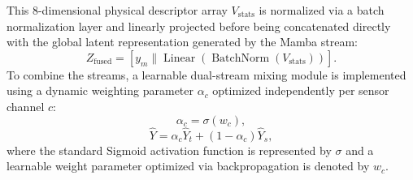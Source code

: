 \documentclass[runningheads]{llncs}
\begin{document}
This 8-dimensional physical descriptor array $V_{\text{stats}}$ is normalized via a batch normalization layer and linearly projected before being concatenated directly with the global latent representation generated by the Mamba stream:
\begin{equation}
Z_{\text{fused}} = \left[ y_{m} \parallel \operatorname{Linear}\left(\operatorname{BatchNorm}\left(V_{\text{stats}}\right)\right) \right].
\tag{19}
\end{equation}
To combine the streams, a learnable dual-stream mixing module is implemented using a dynamic weighting parameter $\alpha_{c}$ optimized independently per sensor channel $c$:
\begin{equation}
\alpha_{c} = \sigma (w_{c}),
\tag{20}
\end{equation}
\begin{equation}
\widehat{Y} = \alpha_{c} \widehat{Y}_{t} + (1 - \alpha_{c}) \widehat{Y}_{s},
\tag{21}
\end{equation}
where the standard Sigmoid activation function is represented by $\sigma$ and a learnable weight parameter optimized via backpropagation is denoted by $w_{c}$.
\end{document}
